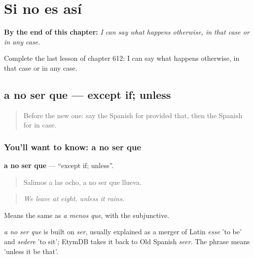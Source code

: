 
\chapter{Si no es así}
\label{ch:es-si-no-es-asi}

\begin{chapteropening}
\textbf{By the end of this chapter:} \emph{I can say what happens otherwise, in that case or in any case.}

Complete the last lesson of chapter 612: I can say what happens otherwise, in that case or in any case.
\end{chapteropening}

\section[a no ser que]{a no ser que — except if; unless}

\label{lesson:ES-C612-a-no-ser-que}



\begin{quote}
Before the new one: say the Spanish for provided that, then the Spanish for in case.
\end{quote}

\subsection*{You'll want to know: a no ser que}
\textbf{a no ser que} — \textquotedblleft{}except if; unless\textquotedblright{}.

\begin{quote}
Salimos a las ocho, a no ser que llueva.
\end{quote}

\begin{quote}
\emph{We leave at eight, unless it rains.}
\end{quote}

Means the same as \emph{a menos que}, with the subjunctive.

\begin{cousinweb}
\emph{a no ser que} is built on \emph{ser}, usually explained as a merger of Latin \emph{esse} 'to be' and \emph{sedere} 'to sit'; EtymDB takes it back to Old Spanish \emph{seer}. The phrase means 'unless it be that'.
\end{cousinweb}

